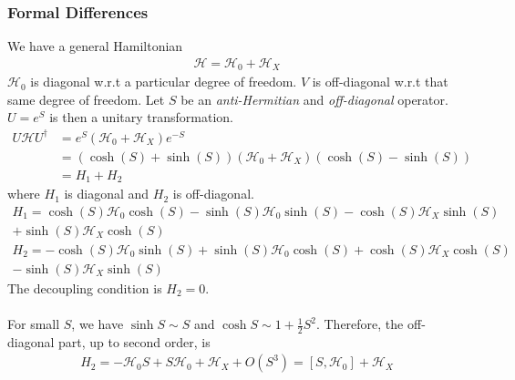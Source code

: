\documentclass[twoside]{report}
\numberwithin{equation}{section}
\begin{document}
\subsubsection{Formal Differences}
We have a general Hamiltonian
\begin{equation}\begin{aligned}
\mathcal{H} = \mathcal{H}_0 + \mathcal{H}_X
\end{aligned}\end{equation}
\(\mathcal{H}_0\) is diagonal w.r.t a particular degree of freedom. \(V\) is off-diagonal w.r.t that same degree of freedom. Let \(S\) be an \textit{anti-Hermitian} and \textit{off-diagonal} operator. \(U = e^S\) is then a unitary transformation.
\begin{equation}\begin{aligned}
	U \mathcal{H} U^\dagger &= e^S \left(\mathcal{H}_0 + \mathcal{H}_X\right)e^{-S}\\
				&= \left(\cosh\left(S\right) + \sinh\left(S\right)\right)\left(\mathcal{H}_0 + \mathcal{H}_X\right)\left(\cosh\left(S\right) - \sinh\left(S\right)\right)\\
         &= H_1 + H_2
\end{aligned}\end{equation}
where \(H_1\) is diagonal and \(H_2\) is off-diagonal.
\begin{equation}\begin{aligned}
	H_1=\cosh\left(S\right) \mathcal{H}_0 \cosh\left(S\right) - \sinh\left(S\right) \mathcal{H}_0 \sinh\left(S\right) -\cosh\left(S\right) \mathcal{H}_X \sinh\left(S\right)\\
	+\sinh\left(S\right) \mathcal{H}_X \cosh\left(S\right)\\
	H_2 = - \cosh\left(S\right) \mathcal{H}_0 \sinh\left(S\right) + \sinh\left(S\right) \mathcal{H}_0 \cosh\left(S\right) +\cosh\left(S\right) \mathcal{H}_X \cosh\left(S\right)\\
	-\sinh\left(S\right) \mathcal{H}_X \sinh\left(S\right)
\end{aligned}\end{equation}
The decoupling condition is \(H_2=0\).
\\\\For small \(S\), we have \(\sinh S \sim S\) and \(\cosh S \sim 1 + \frac{1}{2} S^2\). Therefore, the off-diagonal part, up to second order, is 
\begin{equation}\begin{aligned}
	H_2 = -\mathcal{H}_0 S + S \mathcal{H}_0 + \mathcal{H}_X + O(S^3) = \left[S,\mathcal{H}_0\right] + \mathcal{H}_X
\end{aligned}\end{equation}
\end{document}
